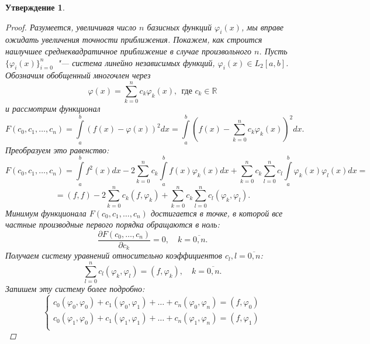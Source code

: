 \documentclass[11pt,a4paper,twoside]{report}
\numberwithin{equation}{section}
\newtheorem*{statement}{Утверждение}
\theoremstyle{definition}
\theoremstyle{plain}
\begin{document}
\begin{statement}
\begin{proof}
        Разумеется, увеличивая число $n$ базисных функций $\varphi_i(x)$, мы
        вправе ожидать увеличения точности приближения. Покажем, как строится
        наилучшее среднеквадратичное приближение в случае произвольного $n$.
        Пусть $\{\varphi_i(x)\}_{i=0}^n$~"--- система
        линейно независимых функций, $\varphi_i(x) \in L_2[a,b]$. Обозначим
        обобщенный многочлен через
        $$
        \varphi(x) = \sum\limits_{k=0}^n c_k\varphi_k(x), ~~\mbox{где } c_k\in\mathbb{R}
        $$
        и рассмотрим функционал
        $$
            F(c_0, c_1, \dots, c_n) = \int\limits_a^b (f(x) - \varphi(x))^2dx =
            \int\limits_a^b (f(x) - \sum_{k=0}^n c_k \varphi_k(x))^2dx.
        $$
        Преобразуем это равенство:
        \begin{equation*}
            F(c_0, c_1, \dots, c_n) = \int\limits_a^b f^2(x)dx - 2\sum_{k=0}^nc_k
            \int\limits_a^b f(x) \varphi_k(x)dx + \sum_{k=0}^n c_k \sum_{l=0}^n
            c_l \int\limits_a^b \varphi_k(x) \varphi_l(x) dx =
        \end{equation*}
        \begin{equation*}
            = (f,f) - 2 \sum_{k=0}^n c_k (f, \varphi_k) + \sum_{k=0}^n c_k
            \sum_{l=0}^n c_l(\varphi_k, \varphi_l).
        \end{equation*}
        Минимум функционала $F(c_0, c_1, \dots, c_n)$ достигается в точке,
        в которой все частные производные первого порядка обращаются в ноль:
        $$
            \frac{\partial F(c_0, \dots, c_n)}{\partial c_k} = 0,
            \quad k = \overline{0,n}.
        $$
        Получаем систему уравнений относительно коэффициентов $c_l, l = \overline{0,n}$:
        $$
            \sum_{l=0}^n c_l(\varphi_k, \varphi_l) = (f, \varphi_k),
            \quad k = \overline{0,n}.
        $$
        Запишем эту систему более подробно:
        \begin{equation}
            \begin{cases}
                \label{eq:F_ci_system2}
                c_0(\varphi_0, \varphi_0) + c_1 (\varphi_0, \varphi_1) +
                \ldots + c_n (\varphi_0, \varphi_n) = (f, \varphi_0) \\
                c_0(\varphi_1, \varphi_0) + c_1 (\varphi_1, \varphi_1) +
                \ldots + c_n (\varphi_1, \varphi_n) = (f, \varphi_1) \\

\end{cases}
\end{equation}
\end{proof}
\end{statement}
\end{document}

